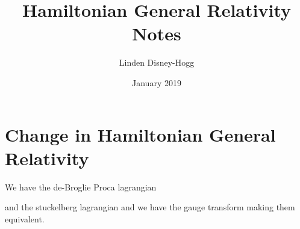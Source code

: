 \documentclass{article}
\title{Hamiltonian General Relativity Notes}
\author{Linden Disney-Hogg}
\date{January 2019}
\begin{document}
\maketitle
\tableofcontents

\section{Change in Hamiltonian General Relativity}

We have the de-Broglie Proca lagrangian 

and the stuckelberg lagrangian
and we have the gauge transform 
making them equivalent. 
\end{document}

